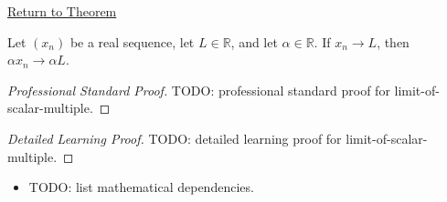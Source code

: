 \newpage
{}
\label{prf:limit-of-scalar-multiple}

\begin{remark*}[Return]
\hyperref[thm:limit-of-scalar-multiple]{Return to Theorem}
\end{remark*}

\begin{theorem*}
Let $(x_n)$ be a real sequence, let $L\in\mathbb{R}$, and let
$\alpha\in\mathbb{R}$. If $x_n\to L$, then $\alpha x_n\to \alpha L$.

\smallskip
\noindent
\end{theorem*}

\begin{proof}[Professional Standard Proof]
\LRAProofBodyStart
TODO: professional standard proof for limit-of-scalar-multiple.
\end{proof}

\begin{proof}[Detailed Learning Proof]
\LRAProofBodyStart
TODO: detailed learning proof for limit-of-scalar-multiple.
\end{proof}

\begin{remark*}
\end{remark*}

\begin{dependencies}
\begin{itemize}
  \item TODO: list mathematical dependencies.
\end{itemize}
\end{dependencies}

\clearpage
